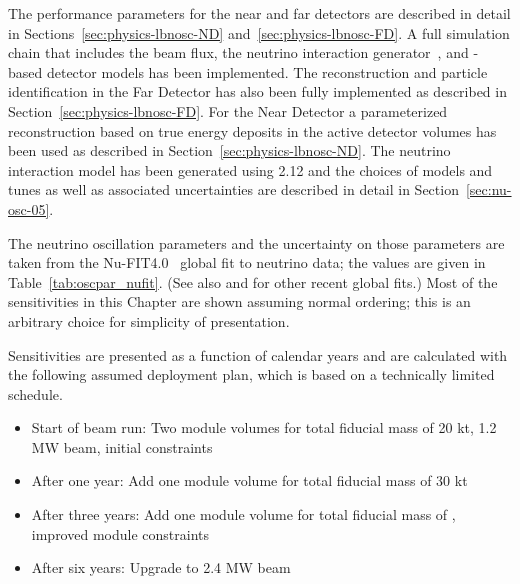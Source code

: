 The performance parameters for the near and far detectors are described in detail in Sections~\ref{sec:physics-lbnosc-ND} and~\ref{sec:physics-lbnosc-FD}. A full simulation chain that includes the beam flux, the  %
neutrino interaction
generator~\cite{Andreopoulos:2009rq}, and -based %
detector models has been implemented. 
The reconstruction and particle identification in the Far Detector has also been fully implemented as described in Section~\ref{sec:physics-lbnosc-FD}. For the Near Detector a parameterized reconstruction based on true energy deposits in the active detector volumes has been used as described in Section~\ref{sec:physics-lbnosc-ND}. The neutrino interaction model has been generated using  2.12 and the choices of models and tunes as well as associated uncertainties are described in detail in Section~\ref{sec:nu-osc-05}.

The neutrino oscillation parameters and the uncertainty on those parameters are taken from the Nu-FIT4.0~\cite{Esteban:2018azc,nufitweb} global fit to neutrino data; the
values are given in Table~\ref{tab:oscpar_nufit}.  (See also
\cite{deSalas:2017kay} and \cite{Capozzi:2017yic} for other recent global fits.) Most of the sensitivities in this Chapter are shown assuming normal ordering; this is an arbitrary choice for simplicity of presentation.

Sensitivities are presented as a function of calendar years and are calculated with the following assumed deployment plan, which is based on a technically limited schedule.
\begin{itemize}
    \item Start of beam run: Two  module %
    volumes for total fiducial mass of 20 kt, 1.2 MW beam, initial  %
    constraints
    \item After one year: Add one  module  volume for total fiducial mass of 30 kt
    \item After three years: Add one  module  volume for total fiducial mass of \fdfiducialmass, improved  module  constraints
    \item After six years: Upgrade to 2.4 MW beam
\end{itemize}

